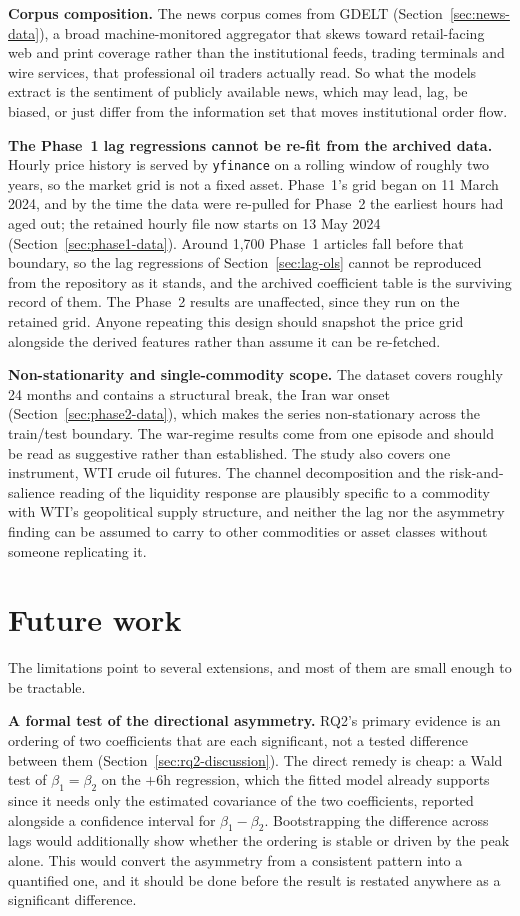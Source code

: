 \textbf{Corpus composition.} The news corpus comes from GDELT (Section~\ref{sec:news-data}), a broad machine-monitored aggregator that skews toward retail-facing web and print coverage rather than the institutional feeds, trading terminals and wire services, that professional oil traders actually read. So what the models extract is the sentiment of publicly available news, which may lead, lag, be biased, or just differ from the information set that moves institutional order flow.

\textbf{The Phase~1 lag regressions cannot be re-fit from the archived data.} Hourly price history is served by \texttt{yfinance} on a rolling window of roughly two years, so the market grid is not a fixed asset. Phase~1's grid began on 11 March 2024, and by the time the data were re-pulled for Phase~2 the earliest hours had aged out; the retained hourly file now starts on 13 May 2024 (Section~\ref{sec:phase1-data}). Around 1{,}700 Phase~1 articles fall before that boundary, so the lag regressions of Section~\ref{sec:lag-ols} cannot be reproduced from the repository as it stands, and the archived coefficient table is the surviving record of them. The Phase~2 results are unaffected, since they run on the retained grid. Anyone repeating this design should snapshot the price grid alongside the derived features rather than assume it can be re-fetched.

\textbf{Non-stationarity and single-commodity scope.} The dataset covers roughly 24 months and contains a structural break, the Iran war onset (Section~\ref{sec:phase2-data}), which makes the series non-stationary across the train/test boundary. The war-regime results come from one episode and should be read as suggestive rather than established. The study also covers one instrument, WTI crude oil futures. The channel decomposition and the risk-and-salience reading of the liquidity response are plausibly specific to a commodity with WTI's geopolitical supply structure, and neither the lag nor the asymmetry finding can be assumed to carry to other commodities or asset classes without someone replicating it.

\section{Future work}\label{sec:future-work}

The limitations point to several extensions, and most of them are small enough to be tractable.

\textbf{A formal test of the directional asymmetry.} RQ2's primary evidence is an ordering of two coefficients that are each significant, not a tested difference between them (Section~\ref{sec:rq2-discussion}). The direct remedy is cheap: a Wald test of $\beta_1 = \beta_2$ on the $+6$h regression, which the fitted model already supports since it needs only the estimated covariance of the two coefficients, reported alongside a confidence interval for $\beta_1 - \beta_2$. Bootstrapping the difference across lags would additionally show whether the ordering is stable or driven by the peak alone. This would convert the asymmetry from a consistent pattern into a quantified one, and it should be done before the result is restated anywhere as a significant difference.

